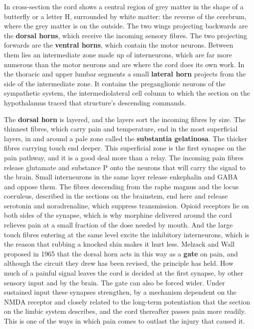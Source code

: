 \documentclass[11pt]{article}
\begin{document}
In cross-section the cord shows a central region of grey matter in the shape of a butterfly or a letter H, surrounded by white matter: the reverse of the cerebrum, where the grey matter is on the outside. The two wings projecting backwards are the \textbf{dorsal horns}, which receive the incoming sensory fibres. The two projecting forwards are the \textbf{ventral horns}, which contain the motor neurons. Between them lies an intermediate zone made up of interneurons, which are far more numerous than the motor neurons and are where the cord does its own work. In the thoracic and upper lumbar segments a small \textbf{lateral horn} projects from the side of the intermediate zone. It contains the preganglionic neurons of the sympathetic system, the intermediolateral cell column to which the section on the hypothalamus traced that structure's descending commands.

The \textbf{dorsal horn} is layered, and the layers sort the incoming fibres by size. The thinnest fibres, which carry pain and temperature, end in the most superficial layers, in and around a pale zone called the \textbf{substantia gelatinosa}. The thicker fibres carrying touch end deeper. This superficial zone is the first synapse on the pain pathway, and it is a good deal more than a relay. The incoming pain fibres release glutamate and substance P onto the neurons that will carry the signal to the brain. Small interneurons in the same layer release enkephalin and GABA and oppose them. The fibres descending from the raphe magnus and the locus coeruleus, described in the sections on the brainstem, end here and release serotonin and noradrenaline, which suppress transmission. Opioid receptors lie on both sides of the synapse, which is why morphine delivered around the cord relieves pain at a small fraction of the dose needed by mouth. And the large touch fibres entering at the same level excite the inhibitory interneurons, which is the reason that rubbing a knocked shin makes it hurt less. Melzack and Wall proposed in 1965 that the dorsal horn acts in this way as a \textbf{gate} on pain, and although the circuit they drew has been revised, the principle has held. How much of a painful signal leaves the cord is decided at the first synapse, by other sensory input and by the brain. The gate can also be forced wider. Under sustained input these synapses strengthen, by a mechanism dependent on the NMDA receptor and closely related to the long-term potentiation that the section on the limbic system describes, and the cord thereafter passes pain more readily. This is one of the ways in which pain comes to outlast the injury that caused it.
\end{document}

